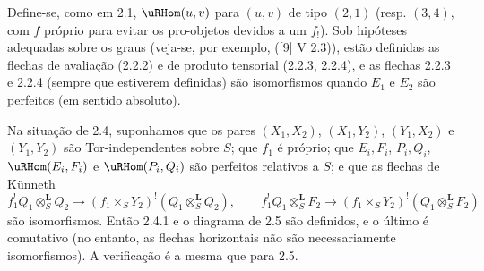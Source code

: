 Define-se, como em 2.1, $\uRHom(u,v)$ para $(u,v)$ de tipo $(2,1)$ (resp. $(3,4)$, com $f$ próprio para evitar os pro-objetos devidos a um $f_!$). Sob hipóteses adequadas sobre os graus (veja-se, por exemplo, ([9] V 2.3)), estão definidas as flechas de avaliação (2.2.2) e de produto tensorial (2.2.3, 2.2.4), e as flechas 2.2.3 e 2.2.4 (sempre que estiverem definidas) são isomorfismos quando $E_1$ e $E_2$ são perfeitos (em sentido absoluto).

Na situação de 2.4, suponhamos que os pares $(X_1,X_2)$, $(X_1,Y_2)$, $(Y_1,X_2)$ e $(Y_1,Y_2)$ são Tor-independentes sobre $S$; que $f_1$ é próprio; que $E_i,F_i$, $P_i,Q_i$, $\uRHom(E_i,F_i)$ e $\uRHom(P_i,Q_i)$ são perfeitos relativos a $S$; e que as flechas de Künneth
\[
f_1^!Q_1\otimes_S^{\mathbf L}Q_2\to(f_1\times_SY_2)^!(Q_1\otimes_S^{\mathbf L}Q_2),\qquad
f_1^!Q_1\otimes_S^{\mathbf L}F_2\to(f_1\times_SY_2)^!(Q_1\otimes_S^{\mathbf L}F_2)
\]
são isomorfismos. Então 2.4.1 e o diagrama de 2.5 são definidos, e o último é comutativo (no entanto, as flechas horizontais não são necessariamente isomorfismos). A verificação é a mesma que para 2.5.
